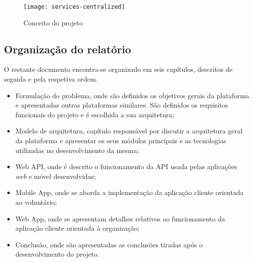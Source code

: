 \bigskip \bigskip \bigskip

\begin{figure}[h]
	\centering
	\texttt{[image: services-centralized]}
	\caption{Conceito do projeto}
\end{figure}

\subsection{Organização do relatório}

O restante documento encontra-se organizado em seis capítulos, descritos de seguida e pela respetiva ordem.
\begin{itemize}
	\item Formulação do problema, onde são definidos os objetivos gerais da plataforma e apresentadas outras plataformas similares. São definidos os requisitos funcionais do projeto e é escolhida a sua arquitetura;
	\item Modelo de arquitetura, capítulo responsável por discutir a arquitetura geral da plataforma e apresentar os seus módulos principais e as tecnologias utilizadas no desenvolvimento da mesma;
	\item Web API, onde é descrito o funcionamento da API usada pelas aplicações \textit{web} e móvel desenvolvidas;
	\item Mobile App, onde se aborda a implementação da aplicação cliente orientada ao voluntário;
	\item Web App, onde se apresentam detalhes relativos ao funcionamento da aplicação cliente orientada à organização;
	\item Conclusão, onde são apresentadas as conclusões tiradas após o desenvolvimento do projeto.
\end{itemize}
























